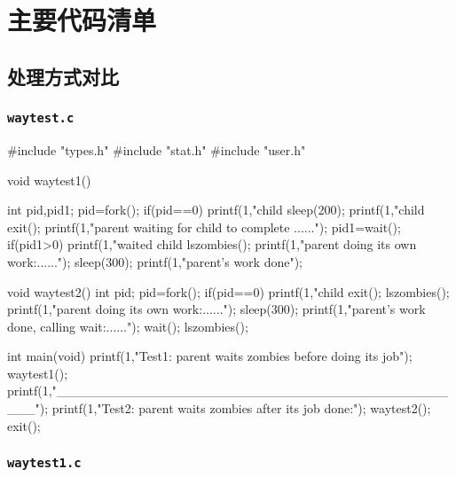 \documentclass{swfuthesism}
\begin{document}
\appendix
\makebib


\chapter{主要代码清单}
\singlespacing

\section{处理方式对比}
\label{sec:cmp}

\subsection{\texttt{waytest.c}}
\label{sec:textttwaytest.c}

\begin{ccode}
#include "types.h"
#include "stat.h"
#include "user.h"

void waytest1()
{
    int pid,pid1;
    pid=fork();
    if(pid==0)
        {
            printf(1,"child %
            sleep(200);
            printf(1,"child %
            exit();
        }
    printf(1,"parent waiting for child to complete ......\n");
    pid1=wait();
    if(pid1>0)
        {
            printf(1,"waited child %
        }
    lszombies();
    printf(1,"parent doing its own work:\n......\n");
    sleep(300);
    printf(1,"parent's work done\n");
    
}

void waytest2()
{
    int pid;
    pid=fork();
    if(pid==0)
    {
      printf(1,"child %
      exit();
    }
    lszombies();
    printf(1,"parent doing its own work:\n......\n");
    sleep(300);
    printf(1,"parent's work done, calling wait:\n......\n");
    wait();
    lszombies();
}

int main(void)
{
  printf(1,"Test1: parent waits zombies before doing its job\n");
  waytest1();
  printf(1,"\n_____________________________________________\n\n");
  printf(1,"Test2: parent waits zombies after its job done:\n");
  waytest2();
  exit();
}
\end{ccode}

\subsection{\texttt{waytest1.c}}
\label{sec:textttwaytest1.c}
\end{document}
